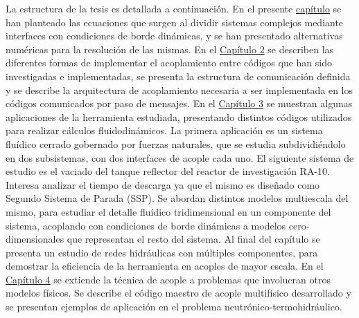 La estructura de la tesis es detallada a continuación.
En el presente \hyperlink{chapter.1}{capítulo} se han planteado las ecuaciones que surgen al dividir sistemas complejos mediante interfaces con condiciones de borde dinámicas,
y se han presentado alternativas numéricas para la resolución de las mismas.
En el \hyperlink{chapter.2}{Capítulo 2} se describen las diferentes formas de implementar el acoplamiento entre códigos que han sido investigadas e implementadas,
se presenta la estructura de comunicación definida y se describe la arquitectura de acoplamiento necesaria a ser implementada en los códigos comunicados por paso de mensajes.
En el \hyperlink{chapter.3}{Capítulo 3} se muestran algunas aplicaciones de la herramienta estudiada,
presentando distintos códigos utilizados para realizar cálculos fluidodinámicos.
La primera aplicación es un sistema fluídico cerrado gobernado por fuerzas naturales, que se estudia subdividiéndolo en dos subsistemas, con dos interfaces de acople cada uno.
El siguiente sistema de estudio es el vaciado del tanque reflector del reactor de investigación RA-10.
Interesa analizar el tiempo de descarga ya que el mismo es diseñado como Segundo Sistema de Parada (SSP).
Se abordan distintos modelos multiescala del mismo, para estudiar el detalle fluídico tridimensional en un componente del sistema,
acoplando con condiciones de borde dinámicas a modelos cero-dimensionales que representan el resto del sistema.
Al final del capítulo se presenta un estudio de redes hidráulicas con múltiples componentes,
para demostrar la eficiencia de la herramienta en acoples de mayor escala.
En el \hyperlink{chapter.4}{Capítulo 4} se extiende la técnica de acople a problemas que involucran otros modelos físicos.
Se describe el código maestro de acople multifísico desarrollado y se presentan ejemplos de aplicación en el problema neutrónico-termohidráulico.

